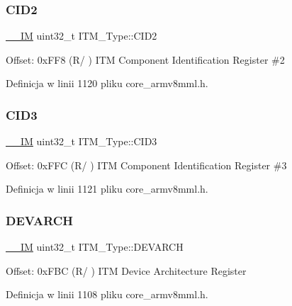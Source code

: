 \subsubsection{\texorpdfstring{C\+I\+D2}{CID2}}
{\footnotesize\ttfamily \hyperlink{core__sc300_8h_a4cc1649793116d7c2d8afce7a4ffce43}{\+\_\+\+\_\+\+IM} uint32\+\_\+t I\+T\+M\+\_\+\+Type\+::\+C\+I\+D2}

Offset\+: 0x\+F\+F8 (R/ ) I\+TM Component Identification Register \#2 

Definicja w linii 1120 pliku core\+\_\+armv8mml.\+h.

\mbox{\label{struct_i_t_m___type_a43451f43f514108d9eaed5b017f8d921}} 
\subsubsection{\texorpdfstring{C\+I\+D3}{CID3}}
{\footnotesize\ttfamily \hyperlink{core__sc300_8h_a4cc1649793116d7c2d8afce7a4ffce43}{\+\_\+\+\_\+\+IM} uint32\+\_\+t I\+T\+M\+\_\+\+Type\+::\+C\+I\+D3}

Offset\+: 0x\+F\+FC (R/ ) I\+TM Component Identification Register \#3 

Definicja w linii 1121 pliku core\+\_\+armv8mml.\+h.

\mbox{\label{struct_i_t_m___type_a2372a4ebb63e36d1eb3fcf83a74fd537}} 
\subsubsection{\texorpdfstring{D\+E\+V\+A\+R\+CH}{DEVARCH}}
{\footnotesize\ttfamily \hyperlink{core__sc300_8h_a4cc1649793116d7c2d8afce7a4ffce43}{\+\_\+\+\_\+\+IM} uint32\+\_\+t I\+T\+M\+\_\+\+Type\+::\+D\+E\+V\+A\+R\+CH}

Offset\+: 0x\+F\+BC (R/ ) I\+TM Device Architecture Register 

Definicja w linii 1108 pliku core\+\_\+armv8mml.\+h.

\mbox{\label{struct_i_t_m___type_ae2ce4d3a54df2fd11a197ccac4406cd0}} 
